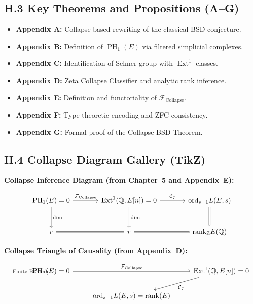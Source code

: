 \documentclass[11pt]{article}
\DeclareMathOperator{\Ext}{Ext}
\DeclareMathOperator{\PH}{PH}
\newcommand{\QQ}{\mathbb{Q}}
\newcommand{\ZZ}{\mathbb{Z}}
\begin{document}
\subsection*{H.3 Key Theorems and Propositions (A–G)}

\begin{itemize}
  \item \textbf{Appendix A:} Collapse-based rewriting of the classical BSD conjecture.
  \item \textbf{Appendix B:} Definition of $\PH_1(E)$ via filtered simplicial complexes.
  \item \textbf{Appendix C:} Identification of Selmer group with $\Ext^1$ classes.
  \item \textbf{Appendix D:} Zeta Collapse Classifier and analytic rank inference.
  \item \textbf{Appendix E:} Definition and functoriality of $\mathcal{F}_{\mathrm{Collapse}}$.
  \item \textbf{Appendix F:} Type-theoretic encoding and ZFC consistency.
  \item \textbf{Appendix G:} Formal proof of the Collapse BSD Theorem.
\end{itemize}

\subsection*{H.4 Collapse Diagram Gallery (TikZ)}

\vspace{0.5em}
\noindent \textbf{Collapse Inference Diagram (from Chapter~5 and Appendix~E):}

\[
\begin{tikzcd}[row sep=large, column sep=large]
\PH_1(E) = 0 \arrow[r, "\mathcal{F}_{\mathrm{Collapse}}"] \arrow[d, "\dim"]
& \Ext^1(\QQ,E[n]) = 0 \arrow[d, "\dim"] \arrow[r, "\mathcal{C}_\zeta"]
& \mathrm{ord}_{s=1} L(E,s) \arrow[d, equal] \\
r \arrow[r, equal] & r \arrow[r, equal] & \mathrm{rank}_{\ZZ} E(\QQ)
\end{tikzcd}
\]


\vspace{1em}
\noindent \textbf{Collapse Triangle of Causality (from Appendix~D):}

\[
\begin{tikzcd}
\PH_1(E) = 0 \arrow[rr, "\mathcal{F}_{\mathrm{Collapse}}"] \arrow[ "\text{Finite Barcode}"]
& & \Ext^1(\QQ,E[n]) = 0 \arrow[dl, "\mathcal{C}_\zeta"] \\
& \mathrm{ord}_{s=1} L(E,s) = \mathrm{rank}(E) &
\end{tikzcd}
\]
\end{document}
